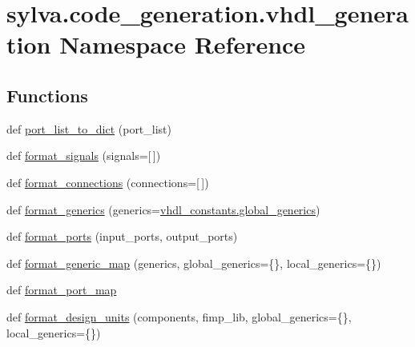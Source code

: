 \hypertarget{namespacesylva_1_1code__generation_1_1vhdl__generation}{}\section{sylva.\+code\+\_\+generation.\+vhdl\+\_\+generation Namespace Reference}
\label{namespacesylva_1_1code__generation_1_1vhdl__generation}
\subsection*{Functions}
\begin{DoxyCompactItemize}
\item 
def \hyperlink{namespacesylva_1_1code__generation_1_1vhdl__generation_a51a60df4116e05e838a7d6c61f434df5}{port\+\_\+list\+\_\+to\+\_\+dict} (port\+\_\+list)
\item 
def \hyperlink{namespacesylva_1_1code__generation_1_1vhdl__generation_a8d3a2a6fdc4ce4af07672a2dd237a75d}{format\+\_\+signals} (signals=\mbox{[}$\,$\mbox{]})
\item 
def \hyperlink{namespacesylva_1_1code__generation_1_1vhdl__generation_a11710d670da0bd9d0787c3d56fd484c7}{format\+\_\+connections} (connections=\mbox{[}$\,$\mbox{]})
\item 
def \hyperlink{namespacesylva_1_1code__generation_1_1vhdl__generation_a94dd1f9bcf57913f20c5a8235e04c3c6}{format\+\_\+generics} (generics=\hyperlink{namespacesylva_1_1code__generation_1_1vhdl__constants_ac7c713d1ce70d2a383d55a7b6dcc1d84}{vhdl\+\_\+constants.\+global\+\_\+generics})
\item 
def \hyperlink{namespacesylva_1_1code__generation_1_1vhdl__generation_ac44fef3535243add66477e8198d8b0a5}{format\+\_\+ports} (input\+\_\+ports, output\+\_\+ports)
\item 
def \hyperlink{namespacesylva_1_1code__generation_1_1vhdl__generation_a5bec5fea3c520448fa87982cb6bfc87f}{format\+\_\+generic\+\_\+map} (generics, global\+\_\+generics=\{\}, local\+\_\+generics=\{\})
\item 
def \hyperlink{namespacesylva_1_1code__generation_1_1vhdl__generation_ab342aa6669b41bf57abfaee8918f33e2}{format\+\_\+port\+\_\+map}
\item 
def \hyperlink{namespacesylva_1_1code__generation_1_1vhdl__generation_a220526068f8d3f59852470bc1879f019}{format\+\_\+design\+\_\+units} (components, fimp\+\_\+lib, global\+\_\+generics=\{\}, local\+\_\+generics=\{\})
\item 

\end{DoxyCompactItemize}

